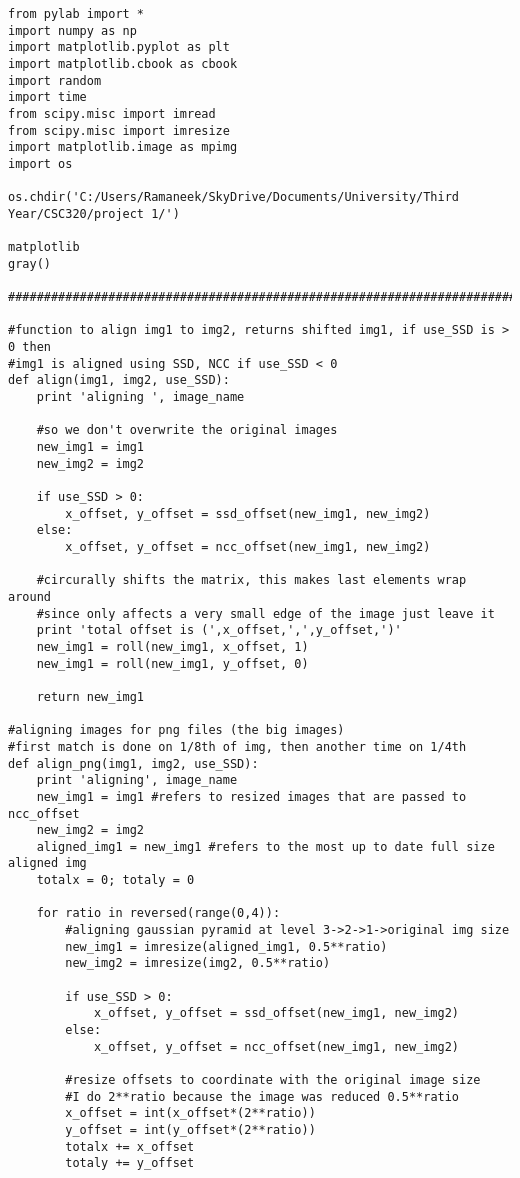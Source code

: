 \documentclass{article}
\begin{document}
\begin{lstlisting}
from pylab import *
import numpy as np
import matplotlib.pyplot as plt
import matplotlib.cbook as cbook
import random
import time
from scipy.misc import imread
from scipy.misc import imresize
import matplotlib.image as mpimg
import os

os.chdir('C:/Users/Ramaneek/SkyDrive/Documents/University/Third Year/CSC320/project 1/')

matplotlib
gray()

#######################################################################

#function to align img1 to img2, returns shifted img1, if use_SSD is > 0 then
#img1 is aligned using SSD, NCC if use_SSD < 0
def align(img1, img2, use_SSD):
    print 'aligning ', image_name

    #so we don't overwrite the original images
    new_img1 = img1 
    new_img2 = img2
    
    if use_SSD > 0:
        x_offset, y_offset = ssd_offset(new_img1, new_img2)
    else:
        x_offset, y_offset = ncc_offset(new_img1, new_img2)
        
    #circurally shifts the matrix, this makes last elements wrap around
    #since only affects a very small edge of the image just leave it
    print 'total offset is (',x_offset,',',y_offset,')'
    new_img1 = roll(new_img1, x_offset, 1)
    new_img1 = roll(new_img1, y_offset, 0)
    
    return new_img1

#aligning images for png files (the big images)
#first match is done on 1/8th of img, then another time on 1/4th
def align_png(img1, img2, use_SSD):
    print 'aligning', image_name
    new_img1 = img1 #refers to resized images that are passed to ncc_offset
    new_img2 = img2 
    aligned_img1 = new_img1 #refers to the most up to date full size aligned img
    totalx = 0; totaly = 0
    
    for ratio in reversed(range(0,4)):
        #aligning gaussian pyramid at level 3->2->1->original img size
        new_img1 = imresize(aligned_img1, 0.5**ratio)
        new_img2 = imresize(img2, 0.5**ratio)
        
        if use_SSD > 0:
            x_offset, y_offset = ssd_offset(new_img1, new_img2)
        else:
            x_offset, y_offset = ncc_offset(new_img1, new_img2)

        #resize offsets to coordinate with the original image size
        #I do 2**ratio because the image was reduced 0.5**ratio
        x_offset = int(x_offset*(2**ratio))
        y_offset = int(y_offset*(2**ratio))
        totalx += x_offset
        totaly += y_offset
        

\end{lstlisting}
\end{document}
